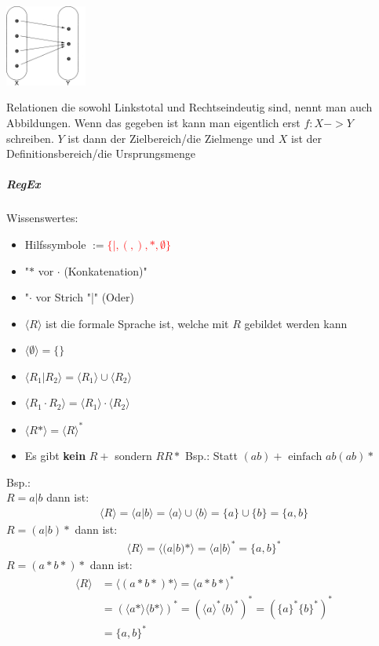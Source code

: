 \documentclass[12pt]{article}
\begin{document}
\begin{flushleft}
\begin{itemize}
        \includegraphics[width=0.2\textwidth]{linkstotal.png}
    \end{itemize}
    Relationen die sowohl Linkstotal und Rechtseindeutig sind, nennt man auch Abbildungen. Wenn das gegeben ist kann man eigentlich erst $f: X -> Y$ schreiben.
    $Y$ ist dann der Zielbereich/die Zielmenge und $X$ ist der Definitionsbereich/die Ursprungsmenge
\end{flushleft}
\subparagraph{\large RegEx}
\normalsize
\begin{flushleft}
    Wissenswertes:
    \begin{itemize}
        \item Hilfssymbole $:=$\textcolor{red}{$\{|,(,),\ast,\emptyset\}$}
        \item "$\ast$ vor $\cdot$ (Konkatenation)"
        \item "$\cdot$ vor Strich "|" (Oder)
        \item $\langle R \rangle$ ist die formale Sprache ist, welche mit $R$ gebildet werden kann
        \item $\langle \emptyset \rangle = \{\}$
        \item $\langle R_1| R_2 \rangle = \langle R_1 \rangle \cup \langle R_2 \rangle$
        \item $\langle R_1 \cdot R_2 \rangle =\langle R_1 \rangle \cdot \langle R_2 \rangle$
        \item $\langle R \ast \rangle = \langle R \rangle ^\ast$
        \item Es gibt \textbf{kein} $R+$ sondern $RR\ast$ Bsp.: Statt $(ab)+ \text{ einfach } ab(ab)\ast$
    \end{itemize}
    Bsp.: \\
    $R = a|b$ dann ist:
    \begin{align*}
        \langle R \rangle = \langle a | b \rangle = \langle a \rangle \cup \langle b \rangle = \{a\} \cup \{b\} = \{a,b\}
    \end{align*}
    $R = (a|b)\ast$ dann ist:
    \begin{align*}
        \langle R \rangle = \langle (a|b)\ast \rangle = \langle a | b \rangle^\ast = \{a,b\}^\ast
    \end{align*}
    $R = (a\ast b\ast)\ast$ dann ist:
    \begin{align*}
        \langle R \rangle &= \langle (a\ast b\ast)\ast \rangle = \langle a\ast b\ast\rangle^\ast \\
        &= (\langle a\ast\rangle\langle b\ast\rangle)^\ast = (\langle a\rangle^\ast\langle b\rangle^\ast)^\ast = (\{a\}^\ast\{b\}^\ast)^\ast \\
        &= \{a,b\}^\ast
    \end{align*}
\end{flushleft}
\end{document}
